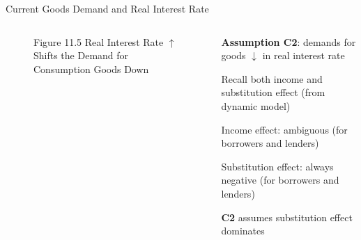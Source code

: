 \documentclass[11pt,aspectratio=169,usenames,dvipsnames]{beamer}
\let\tempone\itemize
\let\temptwo\enditemize
\renewenvironment{itemize}{\tempone\addtolength{\itemsep}{\fill}}{\temptwo}
\begin{document}
\begin{frame}{Current Goods Demand and Real Interest Rate}
\label{slide:Current_Goods_Demand_and_Real_Interest_Rate}
    \begin{columns}
        \begin{column}{0.5\textwidth}
            \begin{figure}
                \caption{\scriptsize Figure 11.5  Real Interest Rate $ \uparrow  $ Shifts the Demand for Consumption Goods Down}
            \end{figure}
        \end{column}
        \begin{column}{0.5\textwidth}
            \textbf{Assumption C2}: demands for goods $ \downarrow  $ in real interest rate
            \begin{itemize}
                \item Recall both \alert{income and substitution effect} (from dynamic model)
                \item Income effect: ambiguous (for borrowers and lenders)
                \item Substitution effect: always negative (for borrowers and lenders)
                \item \textbf{C2} assumes substitution effect dominates
            \end{itemize}
        \end{column}
    \end{columns}
\end{frame}
\end{document}
